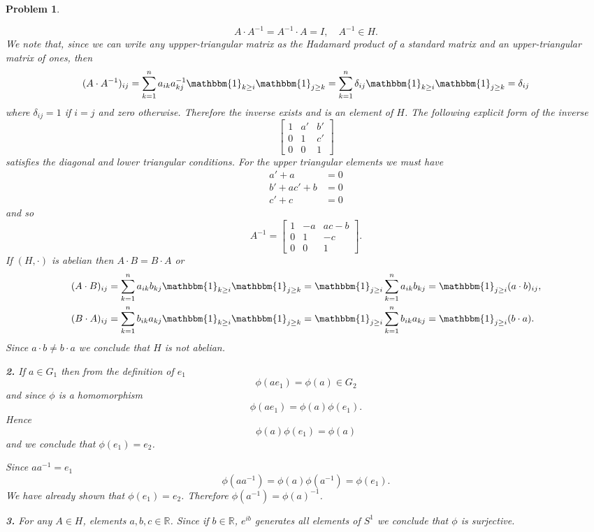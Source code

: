 \documentclass{article}
\theoremstyle{pprop}
\newtheorem{problem}{Problem}[section]
\begin{document}
\begin{problem}
\begin{enumerate}[(1)]
\[
A \cdot A^{-1} = A^{-1} \cdot A = I, \quad A^{-1} \in  H.
\]
We note that, since we can write any uppper-triangular matrix as the Hadamard product of a standard matrix and an upper-triangular 
matrix of ones, then 
\[
(A \cdot A^{-1})_{ij}=\sum_{k=1}^n a_{ik}a^{-1}_{kj}
\mathbbm{1}_{k \geq i} \mathbbm{1}_{j \geq k} = 
\sum_{k=1}^n \delta_{ij}\mathbbm{1}_{k \geq i} \mathbbm{1}_{j \geq k}
=\delta_{ij}
\]
where $\delta_{ij}=1$ if $i=j$ and zero otherwise. Therefore the inverse exists and is an element of $H$. The following explicit form 
of the inverse
\[
\begin{bmatrix}
1 & a' & b' \\
0 & 1 & c' \\
0 & 0 & 1
\end{bmatrix}
\] 
satisfies the diagonal and lower triangular conditions. For the upper triangular elements we must have  
\begin{align*}
a'+a & = 0 \\
b'+ac'+b & = 0 \\
c'+c & = 0
\end{align*}
and so 
\[
A^{-1}=\left[\begin{matrix}1 & - a & a c - b\\0 & 1 & - c\\0 & 0 & 1\end{matrix}\right].
\]
If $({ H},\cdot)$ is abelian then $A \cdot B = B \cdot A$ or 
\begin{align*}
(A\cdot B)_{ij} & =
\sum_{k=1}^n a_{ik} b_{kj} \mathbbm{1}_{k \geq i} \mathbbm{1}_{j \geq k} =
\mathbbm{1}_{j \geq i}\sum_{k=1}^n a_{ik} b_{kj} = \mathbbm{1}_{j \geq i}
(a \cdot b)_{ij},\\
(B \cdot A)_{ij} & = \sum_{k=1}^n b_{ik} a_{kj}  \mathbbm{1}_{k \geq i} \mathbbm{1}_{j \geq k} = 
\mathbbm{1}_{j \geq i}\sum_{k=1}^n b_{ik} a_{kj} 
=\mathbbm{1}_{j \geq i} (b \cdot a).
\end{align*}
Since $a \cdot b \neq b \cdot a$ we conclude that $H$ is not abelian.
\end{enumerate}
\noindent\textbf{2.} If $a \in G_1$ then from the definition of $e_1$
\[
\phi(a e_1 )=\phi(a) \in G_2
\]
and since $\phi$ is a homomorphism 
\[
\phi(a e_1)=\phi(a) \phi(e_1).
\]
Hence
\[
\phi(a) \phi(e_1)=\phi(a)
\]
and we conclude that $\phi(e_1)=e_2$.

Since $a a^{-1} = e_1$
$$
\phi(a a^{-1})=\phi(a) \phi(a^{-1})=\phi(e_1).
$$
We have already shown that $\phi(e_1)=e_2$. Therefore  $\phi(a^{-1})=\phi(a)^{-1}$.
\par\noindent\textbf{3.} For any $A \in H$, elements $a, b , c \in \mathbb{R}$. Since if $b \in \mathbb{R}$, $e^{ib}$ 
generates all elements of $S^1$ we conclude that $\phi$ is surjective.


\end{problem}
\end{document}
